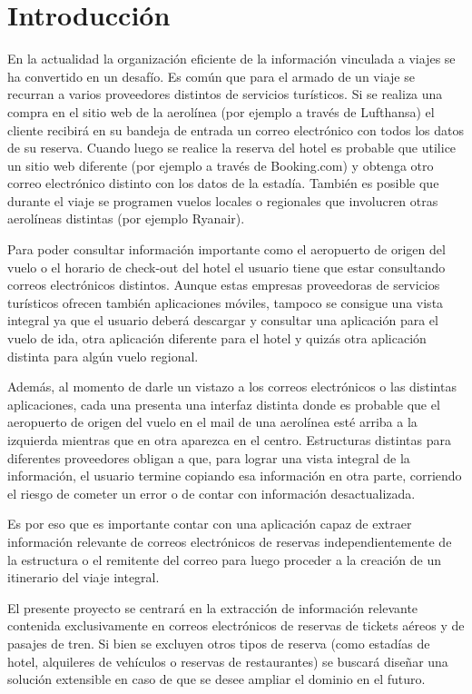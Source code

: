 \FloatBarrier{}
\section{Introducción}%
\label{sec:introduction}

En la actualidad la organización eficiente de la información vinculada a viajes se ha convertido en un desafío.
Es común que para el armado de un viaje se recurran a varios proveedores distintos de servicios turísticos.
Si se realiza una compra en el sitio web de la aerolínea (por ejemplo a través de Lufthansa) el cliente recibirá en su
bandeja de entrada un correo electrónico con todos los datos de su reserva.
Cuando luego se realice la reserva del hotel es probable que utilice un sitio web diferente (por ejemplo a través de
Booking.com) y obtenga otro correo electrónico distinto con los datos de la estadía.
También es posible que durante el viaje se programen vuelos locales o regionales que involucren otras aerolíneas
distintas (por ejemplo Ryanair).

Para poder consultar información importante como el aeropuerto de origen del vuelo o el horario de check-out del hotel
el usuario tiene que estar consultando correos electrónicos distintos.
Aunque estas empresas proveedoras de servicios turísticos ofrecen también aplicaciones móviles, tampoco se consigue una
vista integral ya que el usuario deberá descargar y consultar una aplicación para el vuelo de ida, otra aplicación
diferente para el hotel y quizás otra aplicación distinta para algún vuelo regional.

Además, al momento de darle un vistazo a los correos electrónicos o las distintas aplicaciones, cada una presenta una
interfaz distinta donde es probable que el aeropuerto de origen del vuelo en el mail de una aerolínea esté arriba a la
izquierda mientras que en otra aparezca en el centro.
Estructuras distintas para diferentes proveedores obligan a que, para lograr una vista integral de la información, el
usuario termine copiando esa información en otra parte, corriendo el riesgo de cometer un error o de contar con
información desactualizada.

Es por eso que es importante contar con una aplicación capaz de extraer información relevante de correos electrónicos de
reservas independientemente de la estructura o el remitente del correo para luego proceder a la creación de un
itinerario del viaje integral.

El presente proyecto se centrará en la extracción de información relevante contenida exclusivamente en correos
electrónicos de reservas de tickets aéreos y de pasajes de tren.
Si bien se excluyen otros tipos de reserva (como estadías de hotel, alquileres de vehículos o reservas de restaurantes)
se buscará diseñar una solución extensible en caso de que se desee ampliar el dominio en el futuro.

